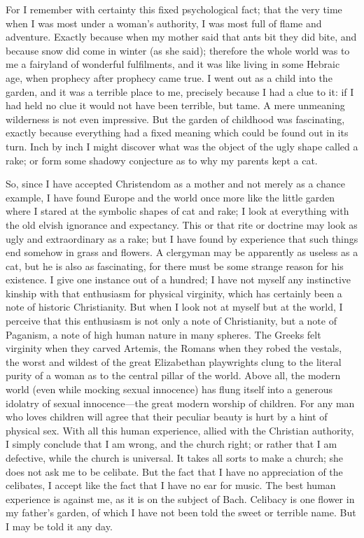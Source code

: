 For I remember with certainty this fixed psychological fact; that the very time when I was most under a woman’s authority, I was most full of flame and adventure. Exactly because when my mother said that ants bit they did bite, and because snow did come in winter (as she said); therefore the whole world was to me a fairyland of wonderful fulfilments, and it was like living in some Hebraic age, when prophecy after prophecy came true. I went out as a child into the garden, and it was a terrible place to me, precisely because I had a clue to it: if I had held no clue it would not have been terrible, but tame. A mere unmeaning wilderness is not even impressive. But the garden of childhood was fascinating, exactly because everything had a fixed meaning which could be found out in its turn. Inch by inch I might discover what was the object of the ugly shape called a rake; or form some shadowy conjecture as to why my parents kept a cat.

So, since I have accepted Christendom as a mother and not merely as a chance example, I have found Europe and the world once more like the little garden where I stared at the symbolic shapes of cat and rake; I look at everything with the old elvish ignorance and expectancy. This or that rite or doctrine may look as ugly and extraordinary as a rake; but I have found by experience that such things end somehow in grass and flowers. A clergyman may be apparently as useless as a cat, but he is also as fascinating, for there must be some strange reason for his existence. I give one instance out of a hundred; I have not myself any instinctive kinship with that enthusiasm for physical virginity, which has certainly been a note of historic Christianity. But when I look not at myself but at the world, I perceive that this enthusiasm is not only a note of Christianity, but a note of Paganism, a note of high human nature in many spheres. The Greeks felt virginity when they carved Artemis, the Romans when they robed the vestals, the worst and wildest of the great Elizabethan playwrights clung to the literal purity of a woman as to the central pillar of the world. Above all, the modern world (even while mocking sexual innocence) has flung itself into a generous idolatry of sexual innocence—the great modern worship of children. For any man who loves children will agree that their peculiar beauty is hurt by a hint of physical sex. With all this human experience, allied with the Christian authority, I simply conclude that I am wrong, and the church right; or rather that I am defective, while the church is universal. It takes all sorts to make a church; she does not ask me to be celibate. But the fact that I have no appreciation of the celibates, I accept like the fact that I have no ear for music. The best human experience is against me, as it is on the subject of Bach. Celibacy is one flower in my father’s garden, of which I have not been told the sweet or terrible name. But I may be told it any day.

